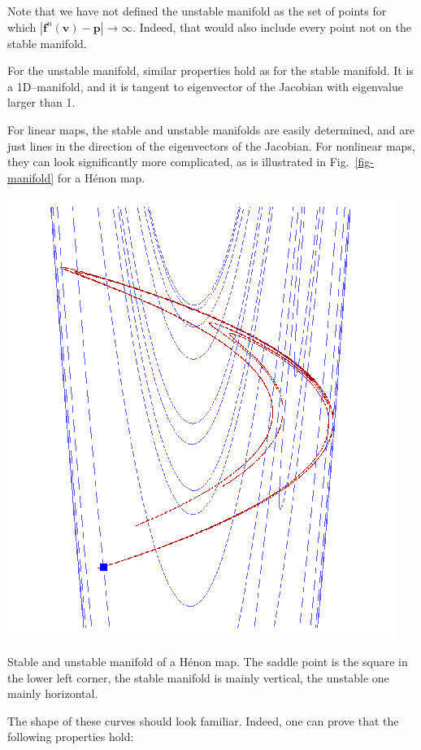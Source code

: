 Note that we have not defined the unstable manifold as the set of points for which $|{\mathbf f}^{n}({\mathbf v}) - {\mathbf p}| \to \infty$. Indeed, that would also include every point not on the stable manifold.

For the unstable manifold, similar properties hold as for the stable manifold. It is a 1D--manifold, and it is tangent to eigenvector of the Jacobian with eigenvalue larger than 1.

For linear maps, the stable and unstable manifolds are easily determined, and are just lines in the direction of the eigenvectors of the Jacobian. For nonlinear maps, they can look significantly more complicated, as is illustrated in Fig.~\ref{fig-manifold} for a H\'{e}non map. 

\begin{marginfigure}
\centering
\includegraphics{dynamic/figures/manifold}
\caption{Stable and unstable manifold of a H\'{e}non map. The saddle point is the square in the lower left corner, the stable manifold is mainly vertical, the unstable one mainly horizontal.}
\label{fig-manifold}
\end{marginfigure} 

The shape of these curves should look familiar. Indeed, one can prove that the following properties hold:

